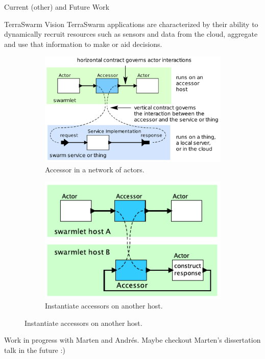 \begin{frame}{Current (other) and Future Work}
  \footnotesize

  \vspace{1em}
  \begin{block}{TerraSwarm Vision}
    TerraSwarm applications are characterized by their ability to
    \alert{dynamically recruit} resources such as sensors and data from the
    cloud, aggregate and use that information to make or aid decisions.
  \end{block}

  \pause
  
  \begin{figure}
    \begin{subfigure}{0.49\textwidth}
      \centering
      \includegraphics[height=0.4\textheight]{figures/accessors.png}
      \caption{Accessor in a network of actors.}
    \end{subfigure}
    \hfill
    \begin{subfigure}{0.49\textwidth}
      \centering
      \includegraphics[height=0.4\textheight]{figures/accessors2.pdf}
      \caption{Instantiate accessors on another host.}
    \end{subfigure}
  \end{figure}

  \pause

  Work in progress with Marten and Andr\'es. Maybe checkout
  Marten's dissertation talk in the future :)
\end{frame}

